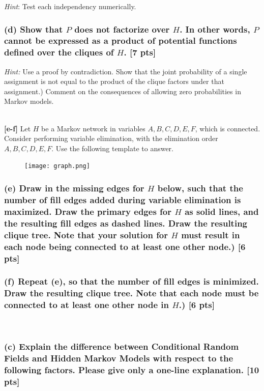 \documentclass[twoside,11pt]{article}\usepackage{amsmath,amsfonts,amsthm,fullpage}
\begin{document}
\emph{Hint}: Test each independency numerically.

\subsubsection*{(d) Show that $P$ does not factorize over $H$. In other words, $P$ cannot be expressed as a product of potential functions defined over the cliques of $H$. [7 pts]}

\emph{Hint:} Use a proof by contradiction. Show that the joint
probability of a single assignment is not equal to the product of
the clique factors under that assignment.) Comment on the
consequences of allowing zero probabilities in Markov models.


~\\

\textbf{[e-f]} Let $H$ be a Markov network in variables $A, B, C, D,
E, F$, which is connected. Consider performing variable elimination,
with the elimination order $A, B, C, D, E, F$. Use the following
template to answer.

\begin{figure}[h!]
\centering
\texttt{[image: graph.png]}
\label{overflow}
\end{figure}

\subsubsection*{(e) Draw in the missing edges for $H$ below, such that the number of fill edges added during variable
elimination is maximized. Draw the primary edges for $H$ as solid
lines, and the resulting fill edges as dashed lines. Draw the
resulting clique tree. Note that your solution for $H$ must result
in each node being connected to at least one other node.) [6 pts]}

\subsubsection*{(f) Repeat (e), so that the number of fill edges is minimized. Draw the resulting
clique tree. Note that each node must be connected to at least one
other node in $H$.) [6 pts]}

~\\
\fi

\subsubsection*{(c) Explain the difference between Conditional Random Fields and Hidden
Markov Models with respect to the following factors. Please give
only a one-line explanation. [10 pts]}
\end{document}
